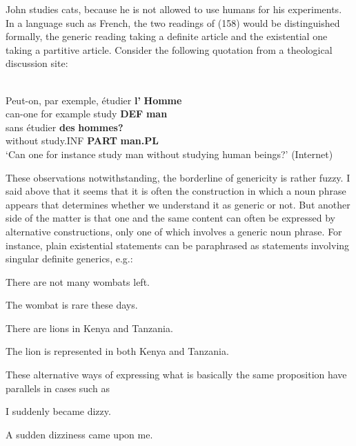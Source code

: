\ea 
\gl \label{bkm:Ref107049114}John studies cats, because he is not allowed to use humans for his experiments. 
\z 
In a language such as French, the two readings of (158) would be distinguished formally, the generic reading taking a definite article and the existential one taking a partitive article. Consider the following quotation from a theological discussion site:


\ea \label{} 
\\
\gll Peut-on,  par  exemple,  étudier  \textbf{l’} \textbf{ Homme}\\
can-one  for  example  study  \textbf{DEF } \textbf{man}\\
\gll sans  étudier  \textbf{des} \textbf{hommes?} \\
without  study.INF  \textbf{PART} \textbf{man.PL} \\
\glt ‘Can one for instance study man without studying human beings?’ (Internet)

\z

These observations notwithstanding, the borderline of genericity is rather fuzzy. I said above that it seems that it is often the construction in which a noun phrase appears that determines whether we understand it as generic or not. But another side of the matter is that one and the same content can often be expressed by alternative constructions, only one of which involves a generic noun phrase. For instance, plain existential statements can be paraphrased as statements involving singular definite generics, e.g.:

\ea
\gl There are not many wombats left.  
 \z

\ea 
\gl The wombat is rare these days.
\z 

\ea 
\gl There are lions in Kenya and Tanzania.
\z 

\ea
\gl The lion is represented in both Kenya and Tanzania. 
\z 

These alternative ways of expressing what is basically the same proposition have parallels in cases such as

\ea
\gl \label{bkm:Ref107116648}I suddenly became dizzy.  
 \z


\ea 
\gl \label{bkm:Ref107116651}A sudden dizziness came upon me.
\z 

